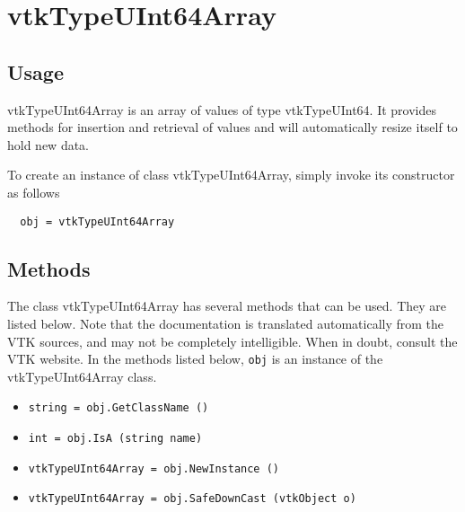 \section{vtkTypeUInt64Array}

\subsection{Usage}

 vtkTypeUInt64Array is an array of values of type vtkTypeUInt64.  It
 provides methods for insertion and retrieval of values and will
 automatically resize itself to hold new data.

To create an instance of class vtkTypeUInt64Array, simply
invoke its constructor as follows
\begin{verbatim}
  obj = vtkTypeUInt64Array
\end{verbatim}
\subsection{Methods}

The class vtkTypeUInt64Array has several methods that can be used.
  They are listed below.
Note that the documentation is translated automatically from the VTK sources,
and may not be completely intelligible.  When in doubt, consult the VTK website.
In the methods listed below, \verb|obj| is an instance of the vtkTypeUInt64Array class.
\begin{itemize}
\item  \verb|string = obj.GetClassName ()|

\item  \verb|int = obj.IsA (string name)|

\item  \verb|vtkTypeUInt64Array = obj.NewInstance ()|

\item  \verb|vtkTypeUInt64Array = obj.SafeDownCast (vtkObject o)|

\end{itemize}
